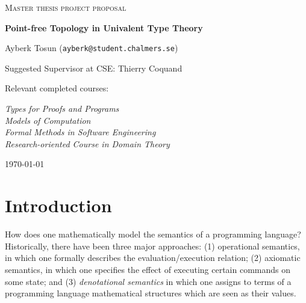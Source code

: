 \documentclass{article}
\begin{document}
\begin{titlepage}
  

\centering
  
  
{\scshape\LARGE Master thesis project proposal\\}
  
\vspace{0.5cm}
  
{\huge\bfseries Point-free Topology in Univalent Type Theory\\}
  
\vspace{2cm}
  
{\Large Ayberk Tosun (\texttt{ayberk@student.chalmers.se})\\}
  
\vspace{1.0cm}
  
{\large Suggested Supervisor at CSE: Thierry Coquand\\}
  
\vspace{1.5cm}
  
{\large Relevant completed courses:\par}
  
{\itshape Types for Proofs and Programs\\}
{\itshape Models of Computation\\}
{\itshape Formal Methods in Software Engineering\\}
{\itshape Research-oriented Course in Domain Theory\\}
  
\vfill

\vfill
  
{\large \today\\} 

\end{titlepage}

\section{Introduction}

How does one mathematically model the semantics of a programming language? Historically,
there have been three major approaches: (1) operational semantics, in which one formally
describes the evaluation/execution relation; (2) axiomatic semantics, in which one
specifies the effect of executing certain commands on some state; and (3)
\emph{denotational semantics} in which one assigns to terms of a programming language
mathematical structures which are seen as their values.
\end{document}
